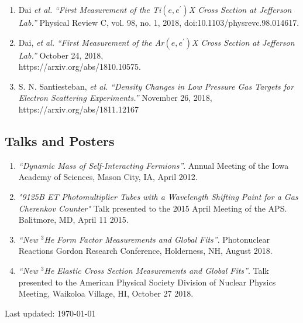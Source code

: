 \documentclass[letterpaper,10pt]{article}
\def\footerlink{}
\renewenvironment{itemize}{
  \begin{list}{}{
    \setlength{\leftmargin}{1.5em}
  }
}{
  \end{list}
}
\begin{document}
{\begin{enumerate}
\item Dai \textit{et al.} \textit{``First Measurement of the Ti$(e,e^{'})$X Cross Section at Jefferson Lab.''} Physical Review C, vol. 98, no. 1, 2018, doi:10.1103/physrevc.98.014617.

\item Dai, \textit{et al.} \textit{``First Measurement of the Ar$(e,e^{'})$X Cross Section at Jefferson Lab.''} October 24, 2018, \\https://arxiv.org/abs/1810.10575.

\item S. N. Santiesteban, \textit{et al.} \textit{``Density Changes in Low Pressure Gas Targets for Electron Scattering Experiments.''} November 26, 2018, https://arxiv.org/abs/1811.12167

\end{enumerate}
\subsection*{Talks and Posters}


	\begin{enumerate}\itemsep1pt \parskip2pt 
		\setcounter{enumi}{4}
		\item \textit{``Dynamic Mass of Self-Interacting Fermions''}. Annual Meeting of the Iowa Academy of Sciences, Mason City, IA, April 2012.

		\item \textit{"9125B ET Photomultiplier Tubes with a Wavelength Shifting Paint for a Gas Cherenkov Counter"} Talk presented to the 2015 April Meeting of the APS. Balitmore, MD, April 11 2015. 
		
		\item \textit{``New $^3$He Form Factor Measurements and Global Fits''}. Photonuclear Reactions Gordon Research Conference, Holderness, NH, August 2018.
		
		\item \textit{``New $^3$He Elastic Cross Section Measurements and Global Fits''}. Talk presented to the American Physical Society Division of Nuclear Physics Meeting, Waikoloa Village, HI, October 27 2018.
	\end{enumerate}


\bigskip
\begin{center}
  \begin{footnotesize}
    Last updated: \today \\
    \href{\footerlink}{\texttt{\footerlink}}
  \end{footnotesize}
\end{center}
}
\end{document}
